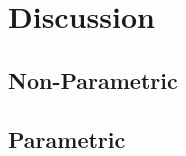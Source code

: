 \chapter{Discussion}


\graphicspath{{Chapter5/Figs/Vector/}{Chapter5/Figs/}}


\section{Non-Parametric}
\blindtext[1]
\section{Parametric}
\blindtext[3]